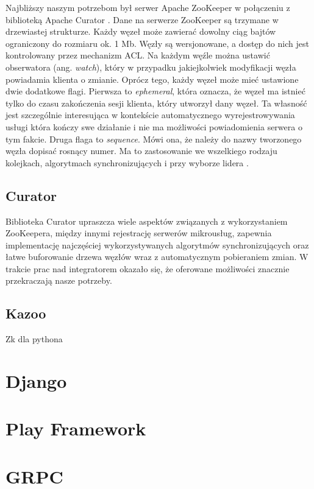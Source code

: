 \documentclass[licencjacka]{pracamgr}
\begin{document}
Najbliższy naszym potrzebom był serwer Apache ZooKeeper \cite{zookeeper} w
połączeniu z biblioteką Apache Curator \cite{curator}. Dane na serwerze
ZooKeeper są trzymane w drzewiastej strukturze. Każdy węzeł może zawierać dowolny
ciąg bajtów ograniczony do rozmiaru ok. 1 Mb. Węzły są wersjonowane, a dostęp
do nich jest kontrolowany przez mechanizm ACL. Na każdym węźle można ustawić
obserwatora (ang. \textit{watch}), który w przypadku jakiejkolwiek modyfikacji
węzła powiadamia klienta o zmianie. Oprócz tego, każdy węzeł może mieć ustawione
dwie dodatkowe flagi. Pierwsza to \textit{ephemeral}, która oznacza, że węzeł ma
istnieć tylko do czasu zakończenia sesji klienta, który utworzył dany węzeł.
Ta własność jest szczególnie interesująca w kontekście automatycznego
wyrejestrowywania usługi która kończy swe działanie i nie ma możliwości
powiadomienia serwera o tym fakcie. Druga flaga to \textit{sequence}. Mówi ona,
że należy do nazwy tworzonego węzła dopisać rosnący numer. Ma to zastosowanie we
wszelkiego rodzaju kolejkach, algorytmach synchronizujących i przy wyborze
lidera \cite{curatorlock}.

\subsection{Curator}
Biblioteka Curator upraszcza wiele aspektów związanych
z wykorzystaniem ZooKeepera, między innymi rejestrację serwerów mikrousług,
zapewnia implementację najczęściej wykorzystywanych algorytmów synchronizujących
oraz łatwe buforowanie drzewa węzłów wraz z automatycznym pobieraniem zmian. W
trakcie prac nad integratorem okazało się, że oferowane możliwości znacznie przekraczają
nasze potrzeby.

\subsection{Kazoo}
Zk dla pythona

\section{Django}

\section{Play Framework}

\section{GRPC}
\end{document}
